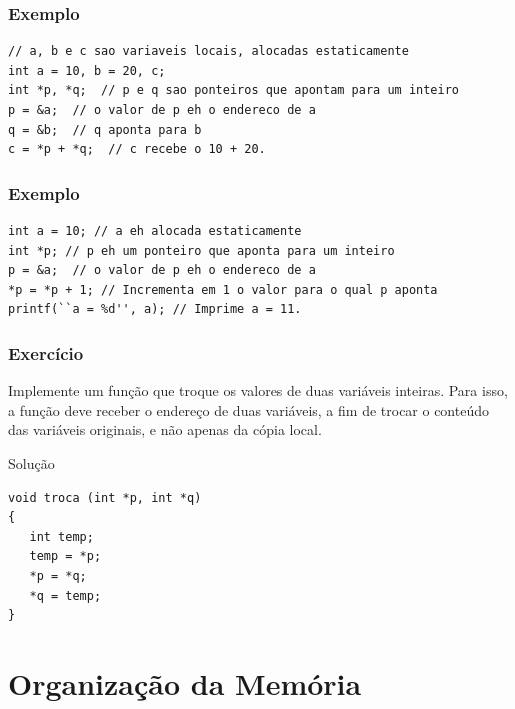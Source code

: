 \documentclass[aspectratio=169]{beamer}
\begin{document}

\begin{frame}[fragile]
\frametitle{Exemplo}
\begin{lstlisting}
// a, b e c sao variaveis locais, alocadas estaticamente
int a = 10, b = 20, c; 
int *p, *q;  // p e q sao ponteiros que apontam para um inteiro
p = &a;  // o valor de p eh o endereco de a
q = &b;  // q aponta para b
c = *p + *q;  // c recebe o 10 + 20.
\end{lstlisting} 
\end{frame}


\begin{frame}[fragile]
\frametitle{Exemplo}
\begin{lstlisting}
int a = 10; // a eh alocada estaticamente
int *p; // p eh um ponteiro que aponta para um inteiro
p = &a;  // o valor de p eh o endereco de a
*p = *p + 1; // Incrementa em 1 o valor para o qual p aponta
printf(``a = %d'', a); // Imprime a = 11.
\end{lstlisting} 
\end{frame}


\begin{frame}
\frametitle{Exercício}
Implemente um função que troque os valores de duas variáveis inteiras. Para isso, a função deve receber o endereço de duas variáveis, a fim de trocar o conteúdo das variáveis originais, e não apenas da cópia local.
\end{frame}


\begin{frame}[fragile]{Solução}
\begin{lstlisting}
void troca (int *p, int *q)
{
   int temp;
   temp = *p; 
   *p = *q; 
   *q = temp;
}
\end{lstlisting} 
\end{frame}

\section{Organização da Memória}
\end{document}
